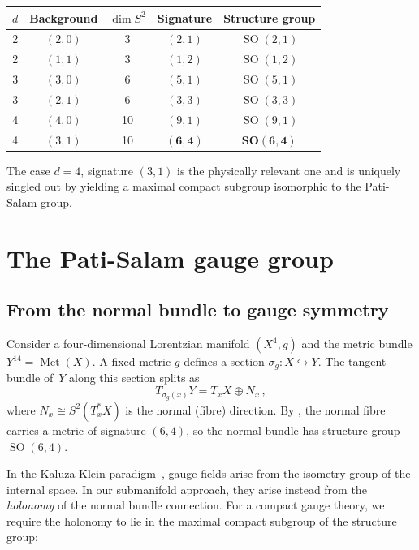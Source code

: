 \documentclass[12pt,a4paper]{article}
\theoremstyle{definition}
\newcommand{\Met}{\operatorname{Met}}
\newcommand{\SO}{\operatorname{SO}}
\begin{document}
\begin{center}
\begin{tabular}{ccccc}
\toprule
$d$ & Background & $\dim S^2$ & Signature & Structure group \\
\midrule
2 & $(2,0)$ & 3 & $(2,1)$ & $\SO(2,1)$ \\
2 & $(1,1)$ & 3 & $(1,2)$ & $\SO(1,2)$ \\
3 & $(3,0)$ & 6 & $(5,1)$ & $\SO(5,1)$ \\
3 & $(2,1)$ & 6 & $(3,3)$ & $\SO(3,3)$ \\
4 & $(4,0)$ & 10 & $(9,1)$ & $\SO(9,1)$ \\
4 & $(3,1)$ & 10 & $\mathbf{(6,4)}$ & $\mathbf{SO(6,4)}$ \\
\bottomrule
\end{tabular}
\end{center}

\noindent
The case $d = 4$, signature $(3,1)$ is the physically relevant one and is uniquely singled out by yielding a maximal compact subgroup isomorphic to the Pati-Salam group.


\section{The Pati-Salam gauge group}
\label{sec:patisalam}

\subsection{From the normal bundle to gauge symmetry}

Consider a four-dimensional Lorentzian manifold $(X^4, g)$ and the metric bundle $Y^{14} = \Met(X)$.
A fixed metric $g$ defines a section $\sigma_g\colon X \hookrightarrow Y$.
The tangent bundle of~$Y$ along this section splits as
\begin{equation}
T_{\sigma_g(x)} Y = T_x X \oplus N_x\,,
\end{equation}
where $N_x \cong S^2(T_x^*X)$ is the normal (fibre) direction.
By , the normal fibre carries a metric of signature $(6,4)$, so the normal bundle has structure group $\SO(6,4)$.

In the Kaluza-Klein paradigm~\cite{KaluzaKlein}, gauge fields arise from the isometry group of the internal space.
In our submanifold approach, they arise instead from the \emph{holonomy} of the normal bundle connection.
For a compact gauge theory, we require the holonomy to lie in the maximal compact subgroup of the structure group:
\end{document}
